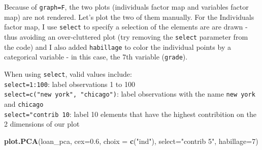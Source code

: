 \documentclass[]{article}
\newenvironment{Shaded}{\begin{snugshade}}{\end{snugshade}}
\newcommand{\CommentTok}[1]{\textcolor[rgb]{0.56,0.35,0.01}{\textit{#1}}}
\newcommand{\DataTypeTok}[1]{\textcolor[rgb]{0.13,0.29,0.53}{#1}}
\newcommand{\DecValTok}[1]{\textcolor[rgb]{0.00,0.00,0.81}{#1}}
\newcommand{\FloatTok}[1]{\textcolor[rgb]{0.00,0.00,0.81}{#1}}
\newcommand{\KeywordTok}[1]{\textcolor[rgb]{0.13,0.29,0.53}{\textbf{#1}}}
\newcommand{\NormalTok}[1]{#1}
\newcommand{\OperatorTok}[1]{\textcolor[rgb]{0.81,0.36,0.00}{\textbf{#1}}}
\newcommand{\StringTok}[1]{\textcolor[rgb]{0.31,0.60,0.02}{#1}}
\begin{document}
\begin{Shaded}
\end{Shaded}

Because of \texttt{graph=F}, the two plots (individuals factor map and
variables factor map) are not rendered. Let's plot the two of them
manually. For the Individuals factor map, I use \texttt{select} to
specify a selection of the elements are are drawn - thus avoiding an
over-cluttered plot (try removing the \texttt{select} parameter from the
code) and I also added \texttt{habillage} to color the individual points
by a categorical variable - in this case, the 7th variable
(\texttt{grade}).

When using \texttt{select}, valid values include:\\
\texttt{select=1:100}: label observations 1 to 100\\
\texttt{select=c("new\ york",\ "chicago")}: label observations with the
name \texttt{new\ york} and \texttt{chicago}\\
\texttt{select="contrib\ 10}: label 10 elements that have the highest
contribition on the 2 dimensions of our plot

\begin{Shaded}
\begin{Highlighting}[]
\KeywordTok{plot.PCA}\NormalTok{(loan_pca, }\DataTypeTok{cex=}\FloatTok{0.6}\NormalTok{, }\DataTypeTok{choix =} \KeywordTok{c}\NormalTok{(}\StringTok{"ind"}\NormalTok{), }\DataTypeTok{select=}\StringTok{"contrib 5"}\NormalTok{, }\DataTypeTok{habillage=}\DecValTok{7}\NormalTok{)}
\end{Highlighting}
\end{Shaded}
\end{document}
